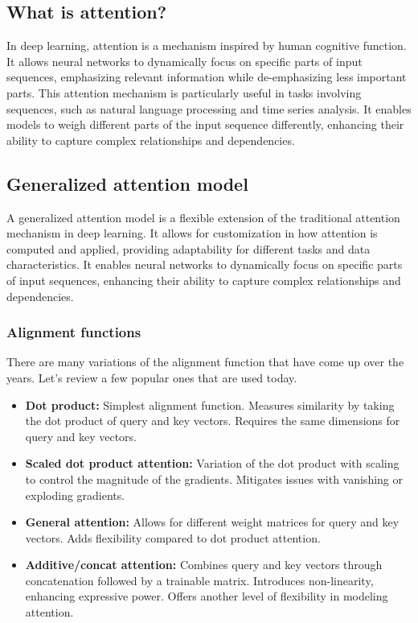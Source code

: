 \documentclass{article}
\begin{document}
\subsection{What is attention?}
In deep learning, attention is a mechanism inspired by human cognitive function. It allows neural networks to dynamically focus on specific parts of input sequences, emphasizing relevant information while de-emphasizing less important parts. This attention mechanism is particularly useful in tasks involving sequences, such as natural language processing and time series analysis. It enables models to weigh different parts of the input sequence differently, enhancing their ability to capture complex relationships and dependencies.
\subsection{Generalized attention model}
A generalized attention model is a flexible extension of the traditional attention mechanism in deep learning. It allows for customization in how attention is computed and applied, providing adaptability for different tasks and data characteristics. It enables neural networks to dynamically focus on specific parts of input sequences, enhancing their ability to capture complex relationships and dependencies.
\subsubsection{Alignment functions}
There are many variations of the alignment function that have come up over the years. Let’s review a
few popular ones that are used today.
\begin{itemize}
    \item \textbf{Dot product:} Simplest alignment function. Measures similarity by taking the dot product of query and key vectors. Requires the same dimensions for query and key vectors.
    \item \textbf{Scaled dot product attention:} Variation of the dot product with scaling to control the magnitude of the gradients. Mitigates issues with vanishing or exploding gradients.
    \item \textbf{General attention:} Allows for different weight matrices for query and key vectors. Adds flexibility compared to dot product attention.
    \item \textbf{Additive/concat attention:} Combines query and key vectors through concatenation followed by a trainable matrix. Introduces non-linearity, enhancing expressive power. Offers another level of flexibility in modeling attention.

\end{itemize}
\end{document}

